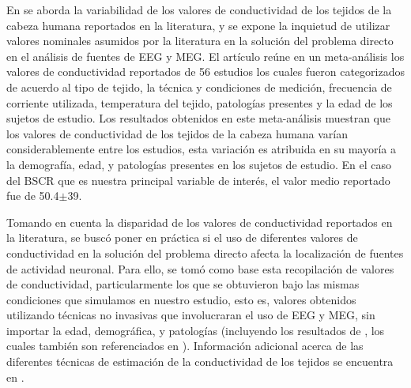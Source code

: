 En \cite{McCann2019} se aborda la variabilidad de los valores de conductividad de los tejidos de la cabeza humana reportados en la literatura, y se expone la inquietud de utilizar valores nominales asumidos por la literatura en la solución del problema directo en el análisis de fuentes de EEG y MEG.
El artículo reúne en un meta-análisis los valores de conductividad reportados de 56 estudios los cuales fueron categorizados de acuerdo al tipo de tejido, la técnica y condiciones de medición, frecuencia de corriente utilizada, temperatura del tejido, patologías presentes y la edad de los sujetos de estudio.
Los resultados obtenidos en este meta-análisis muestran que los valores de conductividad de los tejidos de la cabeza humana varían considerablemente entre los estudios, esta variación es atribuida en su mayoría a la demografía, edad, y patologías presentes en los sujetos de estudio.
En el caso del BSCR que es nuestra principal variable de interés, el valor medio reportado fue de 50.4$\mathbf{\pm}$39. 

Tomando en cuenta la disparidad de los valores de conductividad reportados en la literatura, se buscó poner en práctica si el uso de diferentes valores de conductividad en la solución del problema directo afecta la localización de fuentes de actividad neuronal.
Para ello, se tomó como base esta recopilación de valores de conductividad, particularmente los que se obtuvieron bajo las mismas condiciones que simulamos en nuestro estudio, esto es, valores obtenidos utilizando técnicas no invasivas que involucraran el uso de EEG y MEG, sin importar la edad, demográfica, y patologías (incluyendo los resultados de \cite{Gutierrez2004}, los cuales también son referenciados en \cite{McCann2019}).
Información adicional acerca de las diferentes técnicas de estimación de la conductividad de los tejidos se encuentra en .
